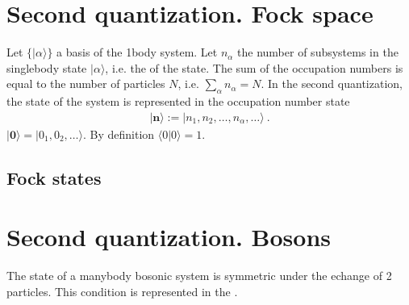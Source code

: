 \documentclass[letterpaper,10pt,english]{jupyterBook}
\begin{document}
\sphinxstepscope


\section{Second quantization. Fock space}
\label{\detokenize{ch/quantum-mechanics/many-body/fock-space:second-quantization-fock-space}}\label{\detokenize{ch/quantum-mechanics/many-body/fock-space:quantum-mechanics-second-quantizazion-second-quantization}}\label{\detokenize{ch/quantum-mechanics/many-body/fock-space::doc}}
\sphinxAtStartPar
Let \(\{ | \alpha \rangle \}\) a basis of the 1\sphinxhyphen{}body system. Let \(n_\alpha\) the number of subsystems in the single\sphinxhyphen{}body state \(| \alpha \rangle\), i.e. the  of the state. The sum of the occupation numbers is equal to the number of particles \(N\), i.e. \(\sum_\alpha n_\alpha = N\). In the second quantization, the state of the system is represented in the occupation number state
\begin{equation*}
\begin{split}| \mathbf{n} \rangle := | n_1, n_2, \dots, n_{\alpha}, \dots \rangle \ .\end{split}
\end{equation*}
\sphinxAtStartPar
{} \(| \mathbf{0} \rangle = | 0_1, 0_2, \dots \rangle\). By definition \(\langle 0 | 0 \rangle = 1\).


\subsection{Fock states}
\label{\detokenize{ch/quantum-mechanics/many-body/fock-space:fock-states}}\label{\detokenize{ch/quantum-mechanics/many-body/fock-space:quantum-mechanics-second-quantizazion-second-quantization-fock-space}}
\sphinxAtStartPar
{} 

\sphinxstepscope


\section{Second quantization. Bosons}
\label{\detokenize{ch/quantum-mechanics/many-body/bosons:second-quantization-bosons}}\label{\detokenize{ch/quantum-mechanics/many-body/bosons:quantum-mechanics-second-quantizazion-bosons}}\label{\detokenize{ch/quantum-mechanics/many-body/bosons::doc}}
\sphinxAtStartPar
The state of a many\sphinxhyphen{}body bosonic system is symmetric under the echange of 2 particles. This condition is represented in the {\hyperref[\detokenize{ch/quantum-mechanics/many-body/bosons:quantum-mechanics-second-quantizazion-bosons-ccr}]{}}.
\end{document}
